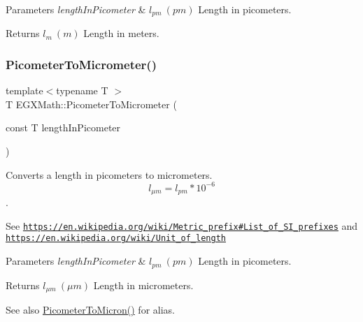\begin{DoxyParams}{Parameters}
{\em length\+In\+Picometer} & $ l_{pm}\ (pm)$ Length in picometers. \\
\hline
\end{DoxyParams}
\begin{DoxyReturn}{Returns}
$ l_{m}\ (m)$ Length in meters. 
\end{DoxyReturn}
\mbox{\label{group___e_g_x_math-_conversions-_length_conversions-_s_i-_picometer-_s_i_gacf7ccbf7130894f8a9075cb9fd66c67d}} 
\subsubsection{\texorpdfstring{Picometer\+To\+Micrometer()}{PicometerToMicrometer()}}
{\footnotesize\ttfamily template$<$typename T $>$ \\
T E\+G\+X\+Math\+::\+Picometer\+To\+Micrometer (\begin{DoxyParamCaption}\item[{const T}]{length\+In\+Picometer }\end{DoxyParamCaption})}



Converts a length in picometers to micrometers. \[ l_{\mu m}=l_{pm} * 10^{-6} \]. 

See \href{https://en.wikipedia.org/wiki/Metric_prefix#List_of_SI_prefixes}{\tt https\+://en.\+wikipedia.\+org/wiki/\+Metric\+\_\+prefix\#\+List\+\_\+of\+\_\+\+S\+I\+\_\+prefixes} and \href{https://en.wikipedia.org/wiki/Unit_of_length}{\tt https\+://en.\+wikipedia.\+org/wiki/\+Unit\+\_\+of\+\_\+length} 
\begin{DoxyParams}{Parameters}
{\em length\+In\+Picometer} & $ l_{pm}\ (pm)$ Length in picometers. \\
\hline
\end{DoxyParams}
\begin{DoxyReturn}{Returns}
$ l_{\mu m}\ (\mu m)$ Length in micrometers. 
\end{DoxyReturn}
\begin{DoxySeeAlso}{See also}
\mbox{\hyperlink{group___e_g_x_math-_conversions-_length_conversions-_s_i-_picometer-_non-_s_i_gad8fddabe74b111596888c370081f725e}{Picometer\+To\+Micron()}} for alias. 
\end{DoxySeeAlso}
\mbox{\label{group___e_g_x_math-_conversions-_length_conversions-_s_i-_picometer-_s_i_gac6c5e481bf86b5c0d2ed7fa6a06a4c8e}} 
